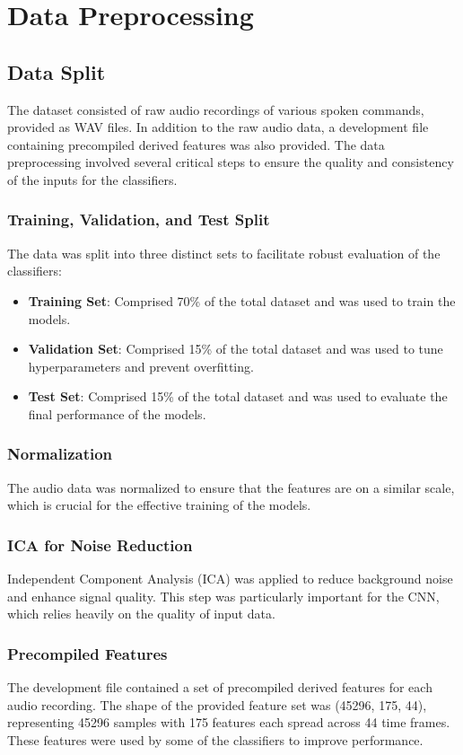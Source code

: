 \section{Data Preprocessing}
    \subsection{Data Split}
        The dataset consisted of raw audio recordings of various spoken commands, provided as WAV files. In addition to the raw audio data, a development file containing precompiled derived features was also provided. The data preprocessing involved several critical steps to ensure the quality and consistency of the inputs for the classifiers.

        \subsubsection{Training, Validation, and Test Split}
            The data was split into three distinct sets to facilitate robust evaluation of the classifiers:
            \begin{itemize}
                \item \textbf{Training Set}: Comprised 70\% of the total dataset and was used to train the models.
                \item \textbf{Validation Set}: Comprised 15\% of the total dataset and was used to tune hyperparameters and prevent overfitting.
                \item \textbf{Test Set}: Comprised 15\% of the total dataset and was used to evaluate the final performance of the models.
            \end{itemize}

        \subsubsection{Normalization}
            The audio data was normalized to ensure that the features are on a similar scale, which is crucial for the effective training of the models.

        \subsubsection{ICA for Noise Reduction}
            Independent Component Analysis (ICA) was applied to reduce background noise and enhance signal quality. This step was particularly important for the CNN, which relies heavily on the quality of input data.

        \subsubsection{Precompiled Features}
            The development file contained a set of precompiled derived features for each audio recording. The shape of the provided feature set was (45296, 175, 44), representing 45296 samples with 175 features each spread across 44 time frames. These features were used by some of the classifiers to improve performance.
